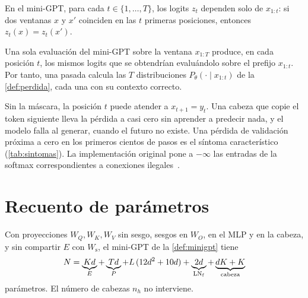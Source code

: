 \addtocounter{definicion}{1}%

\begin{teorema}[Causalidad]\label{teo:causal}
En el mini-GPT, para cada $t\in\{1,\dots,T\}$, los logits $z_t$ dependen solo de $x_{1:t}$: si dos ventanas $x$ y $x'$ coinciden en las $t$ primeras posiciones, entonces $z_t(x)=z_t(x')$.
\end{teorema}

\begin{corolario}\label{cor:una-pasada}
Una sola evaluación del mini-GPT sobre la ventana $x_{1:T}$ produce, en cada posición $t$, los mismos logits que se obtendrían evaluándolo sobre el prefijo $x_{1:t}$. Por tanto, una pasada calcula las $T$ distribuciones $P_\theta(\cdot\mid x_{1:t})$ de la \cref{def:perdida}, cada una con su contexto correcto.
\end{corolario}

\begin{observacion}\label{obs:fuga}
Sin la máscara, la posición $t$ puede atender a $x_{t+1}=y_t$. Una cabeza que copie el token siguiente lleva la pérdida a casi cero sin aprender a predecir nada, y el modelo falla al generar, cuando el futuro no existe. Una pérdida de validación próxima a cero en los primeros cientos de pasos es el síntoma característico (\cref{tab:sintomas}). La implementación original pone a $-\infty$ las entradas de la softmax correspondientes a conexiones ilegales~\cite[§3.2.3]{vaswani}.
\end{observacion}

\section{Recuento de parámetros}

\begin{proposicion}\label{prop:parametros}
Con proyecciones $W_Q,W_K,W_V$ sin sesgo, sesgos en $W_O$, en el MLP y en la cabeza, y sin compartir $E$ con $W_{\mathrm{s}}$, el mini-GPT de la \cref{def:minigpt} tiene
\[
N=\underbrace{Kd}_{E}+\underbrace{Td}_{P}+L\,(12d^{2}+10d)+\underbrace{2d}_{\operatorname{LN}_{\mathrm{f}}}+\underbrace{dK+K}_{\text{cabeza}}
\]
parámetros. El número de cabezas $n_h$ no interviene.
\end{proposicion}

